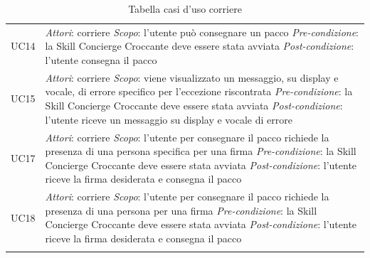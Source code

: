 \begin{center}
\begin{longtable}{  p{2.5cm} p{9.8cm} }
		UC14 &  \textit{Attori}: corriere \newline \textit{Scopo}: l'utente può consegnare un pacco \newline \textit{Pre-condizione}: la Skill Concierge Croccante deve essere stata avviata \newline \textit{Post-condizione}: l'utente consegna il pacco \\
		
		UC15 &  \textit{Attori}: corriere \newline \textit{Scopo}: viene visualizzato un messaggio, su display e vocale, di errore specifico per l'eccezione riscontrata \newline \textit{Pre-condizione}: la Skill Concierge Croccante deve essere stata avviata \newline \textit{Post-condizione}: l'utente riceve un messaggio su display e vocale di errore\\
		
		UC17 &  \textit{Attori}: corriere \newline \textit{Scopo}: l'utente per consegnare il pacco richiede la presenza di una persona specifica per una firma \newline \textit{Pre-condizione}: la Skill Concierge Croccante deve essere stata avviata \newline \textit{Post-condizione}: l'utente riceve la firma desiderata e consegna il pacco\\
		
		UC18 &  \textit{Attori}: corriere \newline \textit{Scopo}: l'utente per consegnare il pacco richiede la presenza di una persona per una firma \newline \textit{Pre-condizione}: la Skill Concierge Croccante deve essere stata avviata \newline \textit{Post-condizione}: l'utente riceve la firma desiderata e consegna il pacco\\
		\rowcolor{white}
		\caption{Tabella casi d'uso corriere}
	\end{longtable}
\end{center}

\newpage
